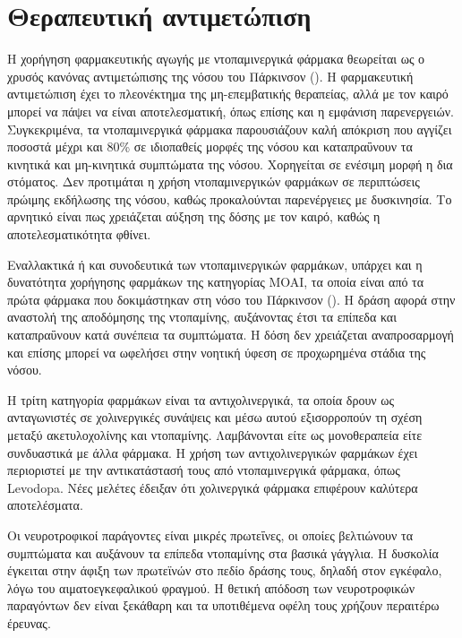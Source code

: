 \documentclass[12pt]{report}
\begin{document}
        \section{Θεραπευτική αντιμετώπιση}
        Η χορήγηση φαρμακευτικής αγωγής με ντοπαμινεργικά φάρμακα θεωρείται ως ο χρυσός κανόνας αντιμετώπισης της νόσου του Πάρκινσον (\emph{\cite{Lee2021ATreatment}}). Η φαρμακευτική αντιμετώπιση έχει το πλεονέκτημα της μη-επεμβατικής θεραπείας, αλλά με τον καιρό μπορεί να πάψει να είναι αποτελεσματική, όπως επίσης και η εμφάνιση παρενεργειών. Συγκεκριμένα, τα ντοπαμινεργικά φάρμακα παρουσιάζουν καλή απόκριση που αγγίζει ποσοστά μέχρι και 80\% σε ιδιοπαθείς μορφές της νόσου και καταπραΰνουν τα κινητικά και μη-κινητικά συμπτώματα της νόσου. Χορηγείται σε ενέσιμη μορφή η δια στόματος. Δεν προτιμάται η χρήση ντοπαμινεργικών φαρμάκων σε περιπτώσεις πρώιμης εκδήλωσης της νόσου, καθώς προκαλούνται παρενέργειες με δυσκινησία. Το αρνητικό είναι πως χρειάζεται αύξηση της δόσης με τον καιρό, καθώς η αποτελεσματικότητα φθίνει. 
        \par
        Εναλλακτικά ή και συνοδευτικά των ντοπαμινεργικών φαρμάκων, υπάρχει και η δυνατότητα χορήγησης φαρμάκων της κατηγορίας MOAI, τα οποία είναι από τα πρώτα φάρμακα που δοκιμάστηκαν στη νόσο του Πάρκινσον (\emph{\cite{Riederer2011MAO-inhibitorsDisease}}). Η δράση αφορά στην αναστολή της αποδόμησης της ντοπαμίνης, αυξάνοντας έτσι τα επίπεδα και καταπραΰνουν κατά συνέπεια τα συμπτώματα. Η δόση δεν χρειάζεται αναπροσαρμογή και επίσης μπορεί να ωφελήσει στην νοητική ύφεση σε προχωρημένα στάδια της νόσου. 
        \par
        Η τρίτη κατηγορία φαρμάκων είναι τα αντιχολινεργικά, τα οποία δρουν ως ανταγωνιστές σε χολινεργικές συνάψεις και μέσω αυτού εξισορροπούν τη σχέση μεταξύ ακετυλοχολίνης και ντοπαμίνης. Λαμβάνονται είτε ως μονοθεραπεία είτε συνδυαστικά με άλλα φάρμακα. Η χρήση των αντιχολινεργικών φαρμάκων έχει περιοριστεί με την αντικατάστασή τους από ντοπαμινεργικά φάρμακα, όπως Levodopa. Νέες μελέτες έδειξαν ότι χολινεργικά φάρμακα επιφέρουν καλύτερα αποτελέσματα.
        \par
        Οι νευροτροφικοί παράγοντες είναι μικρές πρωτεΐνες, οι οποίες βελτιώνουν τα συμπτώματα και αυξάνουν τα επίπεδα ντοπαμίνης στα βασικά γάγγλια. Η δυσκολία έγκειται στην άφιξη των πρωτεϊνών στο πεδίο δράσης τους, δηλαδή στον εγκέφαλο, λόγω του αιματοεγκεφαλικού φραγμού. Η θετική απόδοση των νευροτροφικών παραγόντων δεν είναι ξεκάθαρη και τα υποτιθέμενα οφέλη τους χρήζουν περαιτέρω έρευνας.
\end{document}
